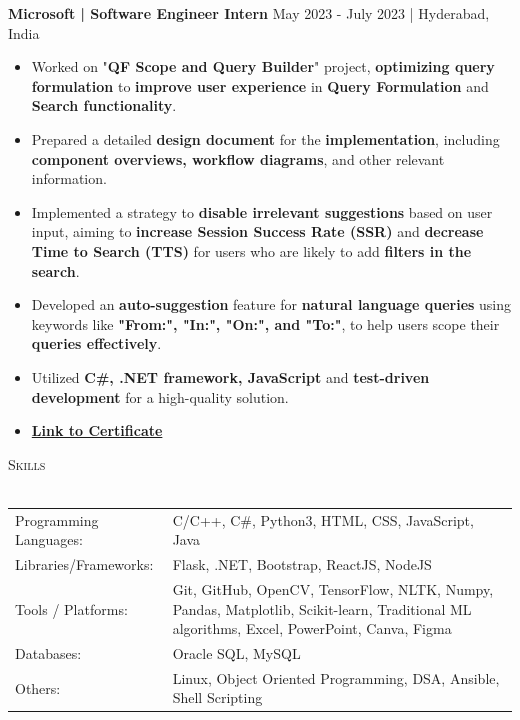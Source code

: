 \documentclass[a4paper]{article}
\newcommand{\lineunder} {
    \vspace*{-8pt} \\
    \hspace*{-18pt} \hrulefill \\
}
\newcommand{\header} [1] {
    {\hspace*{-18pt}\vspace*{6pt} \textsc{#1}}
    \vspace*{-6pt} \lineunder
}
\begin{document}
\vspace{2mm}

\textbf{Microsoft | Software Engineer Intern} \hfill May 2023 - July 2023 | Hyderabad, India \\
\vspace{-1mm}
\begin{itemize} \itemsep -2pt
\item Worked on "\textbf{QF Scope and Query Builder}" project, \textbf{optimizing query formulation} to \textbf{improve user experience} in \textbf{Query Formulation} and \textbf{Search functionality}.
\item Prepared a detailed \textbf{design document} for the \textbf{implementation}, including \textbf{component overviews, workflow diagrams}, and other relevant information.
\item Implemented a strategy to \textbf{disable irrelevant suggestions} based on user input, aiming to \textbf{increase Session Success Rate (SSR)} and \textbf{decrease Time to Search (TTS)} for users who are likely to add \textbf{filters in the search}.
\item Developed an \textbf{auto-suggestion} feature for \textbf{natural language queries} using keywords like \textbf{"From:", "In:", "On:", and "To:"}, to help users scope their \textbf{queries effectively}.
\item Utilized \textbf{C\#, .NET framework, JavaScript} and \textbf{test-driven development} for a high-quality solution.
\item \textbf{\href{https://github.com/Gourav1695/Shaastra_event_iit_madras/blob/main/Microsoft_Internship_Certificate_-_Gourav_Kumar_Shaw1400064(1).pdf}{Link to Certificate}}
\end{itemize}

\header{Skills}
\vspace{2mm}
\begin{tabular}{p{4cm}p{12cm}}
Programming Languages: & C/C++, C\#, Python3, HTML, CSS, JavaScript, Java\\
Libraries/Frameworks: & Flask, .NET, Bootstrap, ReactJS, NodeJS \\
Tools / Platforms: & Git, GitHub, OpenCV, TensorFlow, NLTK, Numpy, Pandas, Matplotlib, Scikit-learn, Traditional ML algorithms, Excel, PowerPoint, Canva, Figma\\
Databases: & Oracle SQL, MySQL\\
Others: & Linux, Object Oriented Programming, DSA, Ansible, Shell Scripting
\end{tabular}
\vspace{1mm}
\end{document}
